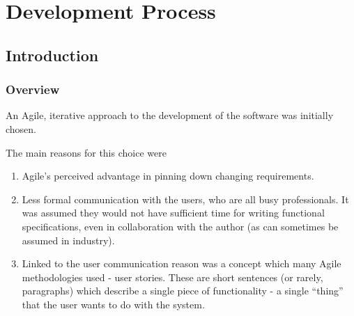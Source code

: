 \chapter{Development Process}

\section{Introduction}

\subsection{Overview}
An Agile, iterative approach to the development of the software was initially chosen.

The main reasons for this choice were
\begin{enumerate}
 \item Agile's perceived advantage in pinning down changing requirements.
 \item Less formal communication with the users, who are all busy professionals. It was assumed they would not have sufficient time for writing functional specifications, even in collaboration with the author (as can sometimes be assumed in industry).
 \item Linked to the user communication reason was a concept which many Agile methodologies used - user stories. These are short sentences (or rarely, paragraphs) which describe a single piece of functionality - a single ``thing'' that the user wants to do with the system.
\end{enumerate}

